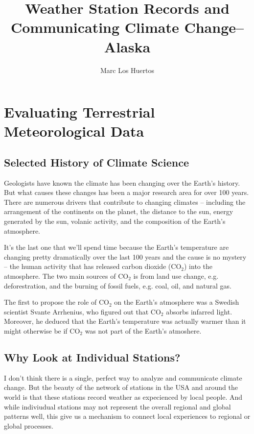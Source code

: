 \documentclass{article}\usepackage[]{graphicx}\usepackage[]{color}
\title{Weather Station Records and Communicating Climate Change--Alaska}
\author{Marc Los Huertos}
\begin{document}
\maketitle

\tableofcontents

\section{Evaluating Terrestrial Meteorological Data}

\subsection{Selected History of Climate Science}

Geologists have known the climate has been changing over the Earth's history. But what causes these changes has been a major research area for over 100 years. There are numerous drivers that contribute to changing climates -- including the arrangement of the continents on the planet, the distance to the sun, energy generated by the sun, volanic activity, and the composition of the Earth's atmosphere. 

It's the last one that we'll spend time because the Earth's temperature are changing pretty dramatically over the last 100 years and the cause is no mystery -- the human activity that has released carbon dioxide (CO$_2$) into the atmosphere. The two main sources of CO$_2$ is from land use change, e.g. deforestration, and the burning of fossil fuels, e.g. coal, oil, and natural gas. 

The first to propose the role of CO$_2$ on the Earth's atmosphere was a Swedish scientist Svante Arrhenius, who figured out that CO$_2$ absorbs infarred light. Moreover, he deduced that the Earth's temperature was actually warmer than it might otherwise be if CO$_2$ was not part of the Earth's atmoshere. 

\subsection{Why Look at Individual Stations?}

I don't think there is a single, perfect way to analyze and communicate climate change. But the beauty of the network of stations in the USA and around the world is that these stations record weather as expecienced by local people. And while indiviudual stations may not represent the overall regional and global patterns well, this give us a mechanism to connect local experiences to regional or global processes. 
\end{document}
